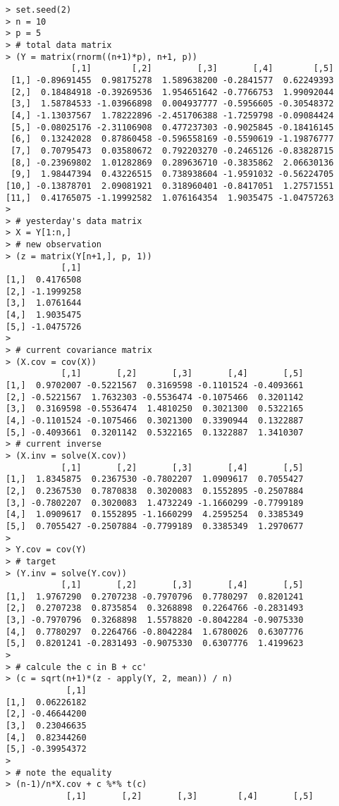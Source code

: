 \documentclass[10pt]{article}
\begin{document}
\begin{verbatim}
> set.seed(2)
> n = 10
> p = 5
> # total data matrix
> (Y = matrix(rnorm((n+1)*p), n+1, p))
             [,1]        [,2]         [,3]       [,4]        [,5]
 [1,] -0.89691455  0.98175278  1.589638200 -0.2841577  0.62249393
 [2,]  0.18484918 -0.39269536  1.954651642 -0.7766753  1.99092044
 [3,]  1.58784533 -1.03966898  0.004937777 -0.5956605 -0.30548372
 [4,] -1.13037567  1.78222896 -2.451706388 -1.7259798 -0.09084424
 [5,] -0.08025176 -2.31106908  0.477237303 -0.9025845 -0.18416145
 [6,]  0.13242028  0.87860458 -0.596558169 -0.5590619 -1.19876777
 [7,]  0.70795473  0.03580672  0.792203270 -0.2465126 -0.83828715
 [8,] -0.23969802  1.01282869  0.289636710 -0.3835862  2.06630136
 [9,]  1.98447394  0.43226515  0.738938604 -1.9591032 -0.56224705
[10,] -0.13878701  2.09081921  0.318960401 -0.8417051  1.27571551
[11,]  0.41765075 -1.19992582  1.076164354  1.9035475 -1.04757263
> 
> # yesterday's data matrix
> X = Y[1:n,]
> # new observation
> (z = matrix(Y[n+1,], p, 1))
           [,1]
[1,]  0.4176508
[2,] -1.1999258
[3,]  1.0761644
[4,]  1.9035475
[5,] -1.0475726
> 
> # current covariance matrix
> (X.cov = cov(X))
           [,1]       [,2]       [,3]       [,4]       [,5]
[1,]  0.9702007 -0.5221567  0.3169598 -0.1101524 -0.4093661
[2,] -0.5221567  1.7632303 -0.5536474 -0.1075466  0.3201142
[3,]  0.3169598 -0.5536474  1.4810250  0.3021300  0.5322165
[4,] -0.1101524 -0.1075466  0.3021300  0.3390944  0.1322887
[5,] -0.4093661  0.3201142  0.5322165  0.1322887  1.3410307
> # current inverse
> (X.inv = solve(X.cov))
           [,1]       [,2]       [,3]       [,4]       [,5]
[1,]  1.8345875  0.2367530 -0.7802207  1.0909617  0.7055427
[2,]  0.2367530  0.7870838  0.3020083  0.1552895 -0.2507884
[3,] -0.7802207  0.3020083  1.4732249 -1.1660299 -0.7799189
[4,]  1.0909617  0.1552895 -1.1660299  4.2595254  0.3385349
[5,]  0.7055427 -0.2507884 -0.7799189  0.3385349  1.2970677
> 
> Y.cov = cov(Y)
> # target
> (Y.inv = solve(Y.cov))
           [,1]       [,2]       [,3]       [,4]       [,5]
[1,]  1.9767290  0.2707238 -0.7970796  0.7780297  0.8201241
[2,]  0.2707238  0.8735854  0.3268898  0.2264766 -0.2831493
[3,] -0.7970796  0.3268898  1.5578820 -0.8042284 -0.9075330
[4,]  0.7780297  0.2264766 -0.8042284  1.6780026  0.6307776
[5,]  0.8201241 -0.2831493 -0.9075330  0.6307776  1.4199623
> 
> # calcule the c in B + cc'
> (c = sqrt(n+1)*(z - apply(Y, 2, mean)) / n)
            [,1]
[1,]  0.06226182
[2,] -0.46644200
[3,]  0.23046635
[4,]  0.82344260
[5,] -0.39954372
> 
> # note the equality
> (n-1)/n*X.cov + c %*% t(c)
            [,1]       [,2]       [,3]        [,4]       [,5]

\end{verbatim}
\end{document}
